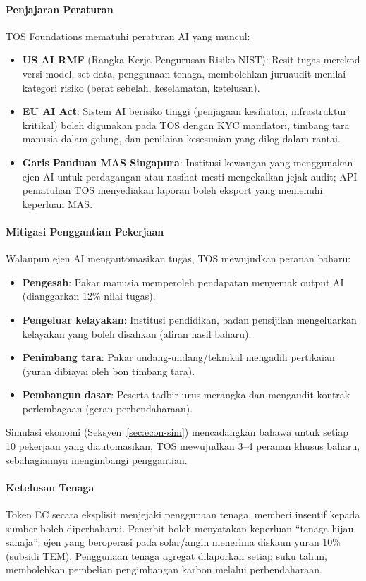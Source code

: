 \documentclass[11pt]{article}
\begin{document}
\paragraph{Penjajaran Peraturan} TOS Foundations mematuhi peraturan AI yang muncul:
\begin{itemize}[noitemsep]
  \item \textbf{US AI RMF} (Rangka Kerja Pengurusan Risiko NIST): Resit tugas merekod versi model, set data, penggunaan tenaga, membolehkan juruaudit menilai kategori risiko (berat sebelah, keselamatan, ketelusan).
  \item \textbf{EU AI Act}: Sistem AI berisiko tinggi (penjagaan kesihatan, infrastruktur kritikal) boleh digunakan pada TOS dengan KYC mandatori, timbang tara manusia-dalam-gelung, dan penilaian kesesuaian yang dilog dalam rantai.
  \item \textbf{Garis Panduan MAS Singapura}: Institusi kewangan yang menggunakan ejen AI untuk perdagangan atau nasihat mesti mengekalkan jejak audit; API pematuhan TOS menyediakan laporan boleh eksport yang memenuhi keperluan MAS.
\end{itemize}

\paragraph{Mitigasi Penggantian Pekerjaan} Walaupun ejen AI mengautomasikan tugas, TOS mewujudkan peranan baharu:
\begin{itemize}[noitemsep]
  \item \textbf{Pengesah}: Pakar manusia memperoleh pendapatan menyemak output AI (dianggarkan 12\% nilai tugas).
  \item \textbf{Pengeluar kelayakan}: Institusi pendidikan, badan pensijilan mengeluarkan kelayakan yang boleh disahkan (aliran hasil baharu).
  \item \textbf{Penimbang tara}: Pakar undang-undang/teknikal mengadili pertikaian (yuran dibiayai oleh bon timbang tara).
  \item \textbf{Pembangun dasar}: Peserta tadbir urus merangka dan mengaudit kontrak perlembagaan (geran perbendaharaan).
\end{itemize}
Simulasi ekonomi (Seksyen~\ref{sec:econ-sim}) mencadangkan bahawa untuk setiap 10 pekerjaan yang diautomasikan, TOS mewujudkan 3--4 peranan khusus baharu, sebahagiannya mengimbangi penggantian.

\paragraph{Ketelusan Tenaga} Token EC secara eksplisit menjejaki penggunaan tenaga, memberi insentif kepada sumber boleh diperbaharui. Penerbit boleh menyatakan keperluan ``tenaga hijau sahaja''; ejen yang beroperasi pada solar/angin menerima diskaun yuran 10\% (subsidi TEM). Penggunaan tenaga agregat dilaporkan setiap suku tahun, membolehkan pembelian pengimbangan karbon melalui perbendaharaan.
\end{document}
